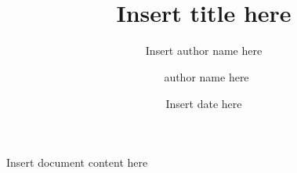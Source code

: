\documentclass[11pt]{article}
\title{\\[1cm]\bfseries Insert title here}
\author{Insert author name here \and\ author name here}
\date{Insert date here}
\begin{document}
\maketitle
\tableofcontents
\setlength\parindent{0pt}
\setlength\parskip{1em}
\begin{markdown}
Insert document content here
\end{markdown}
\end{document}
